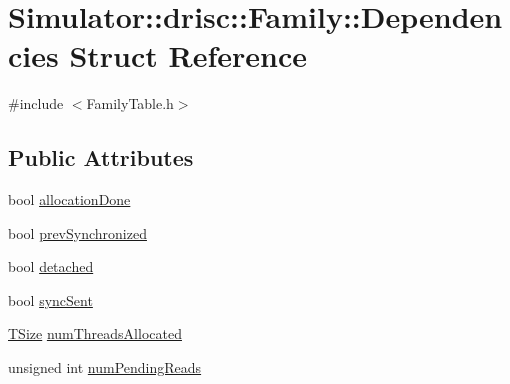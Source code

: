 \hypertarget{struct_simulator_1_1drisc_1_1_family_1_1_dependencies}{\section{Simulator\+:\+:drisc\+:\+:Family\+:\+:Dependencies Struct Reference}
\label{struct_simulator_1_1drisc_1_1_family_1_1_dependencies}
}


{\ttfamily \#include $<$Family\+Table.\+h$>$}

\subsection*{Public Attributes}
\begin{DoxyCompactItemize}
\item 
bool \hyperlink{struct_simulator_1_1drisc_1_1_family_1_1_dependencies_ad2b7c05f9acce21a0d8d624ddb681c92}{allocation\+Done}
\item 
bool \hyperlink{struct_simulator_1_1drisc_1_1_family_1_1_dependencies_a1ca68fd8bae8fc61d26e226888d665db}{prev\+Synchronized}
\item 
bool \hyperlink{struct_simulator_1_1drisc_1_1_family_1_1_dependencies_a1302316095832a5717a22eb68e3aa83c}{detached}
\item 
bool \hyperlink{struct_simulator_1_1drisc_1_1_family_1_1_dependencies_a95a29dc9050a007ff66a5af00246ee0c}{sync\+Sent}
\item 
\hyperlink{namespace_simulator_aefe00209f3ea9f8e24874de522c3c3e7}{T\+Size} \hyperlink{struct_simulator_1_1drisc_1_1_family_1_1_dependencies_a293d76e96e4a703c0ae22318dec999ff}{num\+Threads\+Allocated}
\item 
unsigned int \hyperlink{struct_simulator_1_1drisc_1_1_family_1_1_dependencies_a59ccb5fdc1563794e146cd97090a2be5}{num\+Pending\+Reads}
\end{DoxyCompactItemize}


